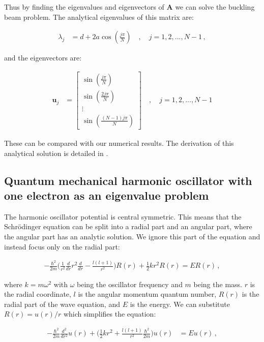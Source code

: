 \documentclass[reprint,english,notitlepage]{revtex4-1}  %
\begin{document}
Thus by finding the eigenvalues and eigenvectors of $\textbf{A}$ we can solve the buckling beam problem. The analytical eigenvalues of this matrix are:

\begin{align*}
\lambda_j &= d + 2a \cos ( \frac{j\pi}{N}) \quad , \quad j = 1,2,...,N-1 \, ,
\end{align*}

and the eigenvectors are:

\begin{align*}
\textbf{u}_j &= \begin{bmatrix}
\sin( \frac{j\pi}{N} ) \\
\sin( \frac{2j\pi}{N} ) \\
\vdots \\
\sin( \frac{(N-1)j\pi}{N} )
\end{bmatrix} \quad , \quad j = 1,2,...,N-1
\end{align*}

These can be compared with our numerical results. The derivation of this analytical solution is detailed in \citep{Lyche2017}.



\subsection{Quantum mechanical harmonic oscillator with one electron as an eigenvalue problem} \label{sec:II:d}

The harmonic oscillator potential is central symmetric. This means that the Schrödinger equation can be split into a radial part and an angular part, where the angular part has an analytic solution. We ignore this part of the equation and instead focus only on the radial part:

\begin{align*}
-\frac{\hbar^2}{2m} \bigg( \frac{1}{r^2} \frac{d}{dr}r^2 \frac{d}{dr} - \frac{l(l+1)}{r^2} \bigg) R(r) + \frac{1}{2}kr^2 R(r) = ER(r) \, ,
\end{align*}

where $k = m\omega^2$ with $\omega$ being the oscillator frequency and $m$ being the mass. $r$ is the radial coordinate, $l$ is the angular momentum quantum number, $R(r)$ is the radial part of the wave equation, and $E$ is the energy. We can substitute $R(r) = u(r)/r$ which simplifies the equation:

\begin{align*}
-\frac{\hbar^2}{2m} \frac{d^2}{dr^2} u(r) + \bigg( \frac{1}{2}kr^2 + \frac{l(l+1)}{r^2} \frac{\hbar^2}{2m} \bigg) u(r) &= Eu(r) \, ,
\end{align*}
\end{document}
